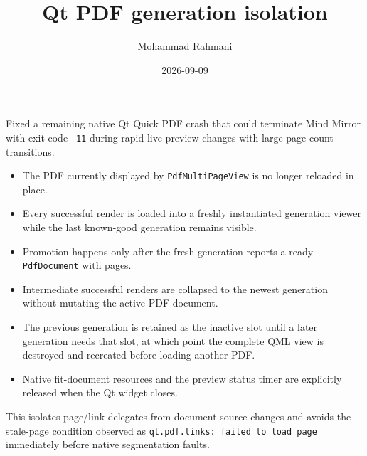 \documentclass[a4paper]{article}
\title{Qt PDF generation isolation}
\date{2026-09-09}
\author{Mohammad Rahmani}
\begin{document}
   \maketitle

   \begin{preview}
      Fixed a remaining native Qt Quick PDF crash that could terminate Mind
      Mirror with exit code \texttt{-11} during rapid live-preview changes with
      large page-count transitions.

      \begin{itemize}
         \item The PDF currently displayed by \texttt{PdfMultiPageView} is no
         longer reloaded in place.
         \item Every successful render is loaded into a freshly instantiated
         generation viewer while the last known-good generation remains visible.
         \item Promotion happens only after the fresh generation reports a ready
         \texttt{PdfDocument} with pages.
         \item Intermediate successful renders are collapsed to the newest
         generation without mutating the active PDF document.
         \item The previous generation is retained as the inactive slot until a
         later generation needs that slot, at which point the complete QML view
         is destroyed and recreated before loading another PDF.
         \item Native fit-document resources and the preview status timer are
         explicitly released when the Qt widget closes.
      \end{itemize}

      This isolates page/link delegates from document source changes and avoids
      the stale-page condition observed as \texttt{qt.pdf.links: failed to load
      page} immediately before native segmentation faults.
   \end{preview}

   
   
\end{document}
